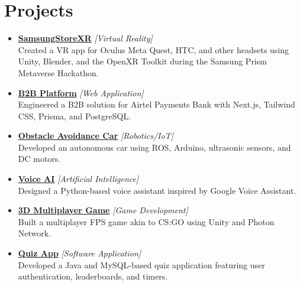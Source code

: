 \documentclass[a4paper,10pt]{article}
\newcommand{\sectionbreak}{\vspace{0.2em}}
\begin{document}
\sectionbreak

\section{Projects}
\begin{itemize}[noitemsep, topsep=0pt]
    \item \href{https://github.com/Shival-Gupta/SamsungStoreXR}{\textcolor{accentcolor}{\textbf{SamsungStoreXR}}} \textit{[Virtual Reality]} \\
    Created a VR app for Oculus Meta Quest, HTC, and other headsets using Unity, Blender, and the OpenXR Toolkit during the Samsung Prism Metaverse Hackathon.
    
    \item \href{https://b2b-portal-rho.vercel.app/}{\textcolor{accentcolor}{\textbf{B2B Platform}}} \textit{[Web Application]} \\
    Engineered a B2B solution for Airtel Payments Bank with Next.js, Tailwind CSS, Prisma, and PostgreSQL.
    
    \item \href{https://github.com/Shival-Gupta/obstacle-avoidance-car-ros-noetic}{\textcolor{accentcolor}{\textbf{Obstacle Avoidance Car}}} \textit{[Robotics/IoT]} \\
    Developed an autonomous car using ROS, Arduino, ultrasonic sensors, and DC motors.
    
    \item \href{https://github.com/Shival-Gupta/VoiceAI}{\textcolor{accentcolor}{\textbf{Voice AI}}} \textit{[Artificial Intelligence]} \\
    Designed a Python-based voice assistant inspired by Google Voice Assistant.
    
    \item \href{https://github.com/Shival-Gupta/WarGame}{\textcolor{accentcolor}{\textbf{3D Multiplayer Game}}} \textit{[Game Development]} \\
    Built a multiplayer FPS game akin to CS:GO using Unity and Photon Network.
    
    \item \href{https://github.com/Shival-Gupta/QuizApp}{\textcolor{accentcolor}{\textbf{Quiz App}}} \textit{[Software Application]} \\
    Developed a Java and MySQL-based quiz application featuring user authentication, leaderboards, and timers.
\end{itemize}
\end{document}
